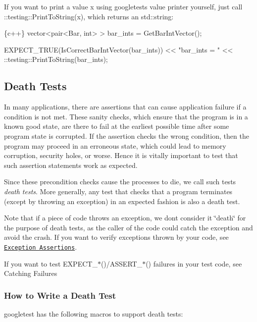If you want to print a value {\ttfamily x} using googletest\textquotesingle{}s value printer yourself, just call {\ttfamily \+::testing\+::\+Print\+To\+String(x)}, which returns an {\ttfamily std\+::string}\+:


\begin{DoxyCode}
\{c++\}
vector<pair<Bar, int> > bar\_ints = GetBarIntVector();

EXPECT\_TRUE(IsCorrectBarIntVector(bar\_ints))
    << "bar\_ints = " << ::testing::PrintToString(bar\_ints);
\end{DoxyCode}


\subsection*{Death Tests}

In many applications, there are assertions that can cause application failure if a condition is not met. These sanity checks, which ensure that the program is in a known good state, are there to fail at the earliest possible time after some program state is corrupted. If the assertion checks the wrong condition, then the program may proceed in an erroneous state, which could lead to memory corruption, security holes, or worse. Hence it is vitally important to test that such assertion statements work as expected.

Since these precondition checks cause the processes to die, we call such tests {\itshape death tests}. More generally, any test that checks that a program terminates (except by throwing an exception) in an expected fashion is also a death test.

Note that if a piece of code throws an exception, we don\textquotesingle{}t consider it \char`\"{}death\char`\"{} for the purpose of death tests, as the caller of the code could catch the exception and avoid the crash. If you want to verify exceptions thrown by your code, see \href{#exception-assertions}{\tt Exception Assertions}.

If you want to test {\ttfamily E\+X\+P\+E\+C\+T\+\_\+$\ast$()/\+A\+S\+S\+E\+R\+T\+\_\+$\ast$()} failures in your test code, see Catching Failures

\subsubsection*{How to Write a Death Test}

googletest has the following macros to support death tests\+:

